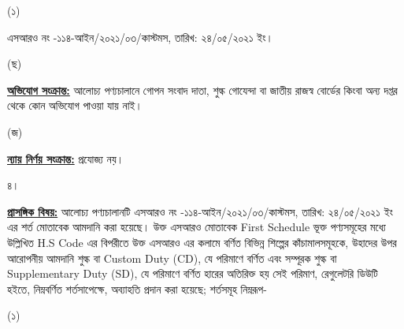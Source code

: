 \documentclass[12pt]{article}
\newcommand{\srooof}{এসআরও নং -১১৪-আইন/২০২১/০৩/কাস্টমস}
\newcommand{\srooofd}{তারিখ: ২৪/০৫/২০২১ ইং}
\begin{document}
\begin{minipage}[t]{0.05\linewidth}
(১)
\end{minipage}
\begin{minipage}[t]{0.85\linewidth}
{\srooof}, {\srooofd}।
\end{minipage}
\begin{minipage}[t]{0.05\linewidth}
\hspace{1em}
\end{minipage}
\begin{minipage}[t]{0.05\linewidth}
(ছ)
\end{minipage}
\begin{minipage}[t]{0.90\linewidth}
\underline{\textbf{অভিযোগ সংক্রান্ত:}} আলোচ্য পণ্যচালানে
গোপন সংবাদ দাতা, শুল্ক গোযেন্দা বা
জাতীয় রাজস্ব বোর্ডের কিংবা অন্য দপ্তর থেকে
কোন অভিযোগ পাওয়া যায় নাই।
\\
\end{minipage}
\begin{minipage}[t]{0.05\linewidth}
\hspace{1em}
\end{minipage}
\begin{minipage}[t]{0.05\linewidth}
(জ)
\end{minipage}
\begin{minipage}[t]{0.90\linewidth}
\underline{\textbf{ন্যায় নির্ণয় সংক্রান্ত:}} প্রযোজ্য নয়।
\\
\end{minipage}
\begin{minipage}[t]{0.05\linewidth}
৪।
\end{minipage}
\begin{minipage}[t]{0.95\linewidth}
\underline{\textbf{প্রাসঙ্গিক বিষয়:}} আলোচ্য পণ্যচালানটি {\srooof}, {\srooofd}
এর শর্ত মোতাবেক আমদানি করা হয়েছে।
উক্ত এসআরও মোতাবেক First Schedule
ভূক্ত পণ্যসমূহের মধ্যে উল্লিখিত H.S Code
এর বিপরীতে উক্ত এসআরও এর কলামে বর্ণিত
বিভিন্ন শিল্পের কাঁচামালসমূহকে, উহাদের উপর
আরোপনীয় আমদানি শুল্ক বা Custom Duty (CD),
যে পরিমাণে বর্ণিত এবং সম্পূরক শুল্ক বা
Supplementary Duty (SD),
যে পরিমাণে বর্ণিত হারের অতিরিক্ত হয় সেই পরিমাণ,
রেগুলেটরি ডিউটি হইতে, নিম্নবর্ণিত শর্তসাপেক্ষে,
অব্যাহতি প্রদান করা হয়েছে; শর্তসমূহ নিম্নরূপ-
\\
\end{minipage}
\begin{minipage}[t]{0.05\linewidth}
\hspace{1em}
\end{minipage}
\begin{minipage}[t]{0.05\linewidth}
(১)
\end{minipage}
\end{document}
